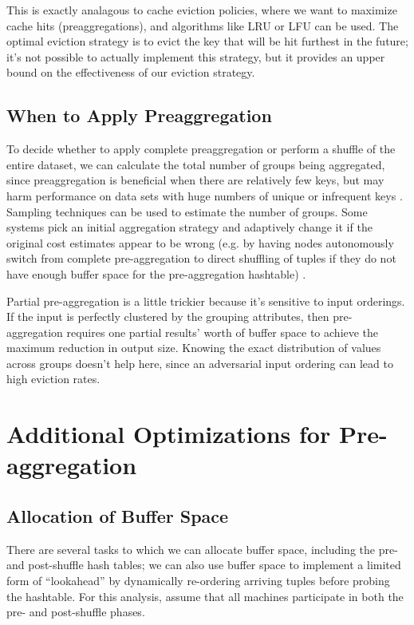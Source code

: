 \documentclass[12pt]{article}
\begin{document}
This is exactly analagous to cache eviction policies, where we want to maximize cache hits (preaggregations), and algorithms like LRU or LFU can be used.
The optimal eviction strategy is to evict the key that will be hit furthest in the future; it's not possible to actually implement this strategy, but it provides an upper bound on the effectiveness of our eviction strategy.



\subsection{When to Apply Preaggregation}

To decide whether to apply complete preaggregation or perform a shuffle of the entire dataset, we can calculate the total number of groups being aggregated, since preaggregation is beneficial when there are relatively few keys, but may harm performance on data sets with huge numbers of unique or infrequent keys \cite{adaptive-aggregation}.
Sampling techniques can be used to estimate the number of groups.
Some systems pick an initial aggregation strategy and adaptively change it if the original cost estimates appear to be wrong (e.g. by having nodes autonomously switch from complete pre-aggregation to direct shuffling of tuples if they do not have enough buffer space for the pre-aggregation hashtable) \cite{adaptive-aggregation}.

Partial pre-aggregation is a little trickier because it's sensitive to input orderings.  If the input is perfectly clustered by the grouping attributes, then pre-aggregation requires one partial results' worth of buffer space to achieve the maximum reduction in output size.  Knowing the exact distribution of values across groups doesn't help here, since an adversarial input ordering can lead to high eviction rates.

\section{Additional Optimizations for Pre-aggregation}

\subsection{Allocation of Buffer Space}
There are several tasks to which we can allocate buffer space, including the pre- and post-shuffle hash tables; we can also use buffer space to implement a limited form of ``lookahead'' by dynamically re-ordering arriving tuples before probing the hashtable.  For this analysis, assume that all machines participate in both the pre- and post-shuffle phases.
\end{document}
